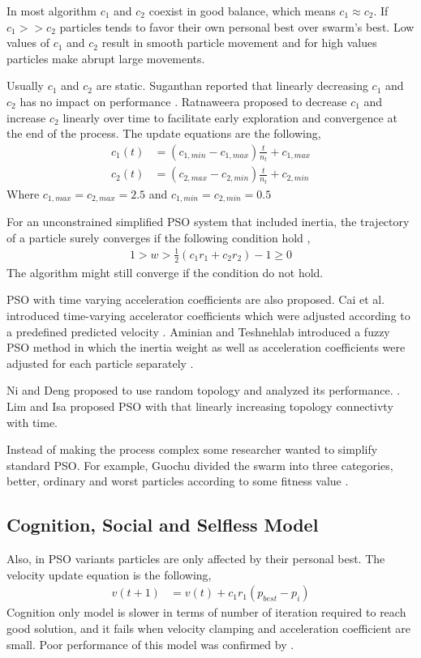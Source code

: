 \documentclass{article}
\begin{document}
In most algorithm $c_1$ and $c_2$ coexist in good balance, which means $c_1 \approx c_2$. If $c_1 >> c_2$ particles tends to favor their own personal best over swarm's best. Low values of $c_1$ and $c_2$ result in smooth particle movement and for high values particles make abrupt large movements.

Usually $c_1$ and $c_2$ are static. Suganthan reported that linearly decreasing $c_1$ and $c_2$ has no impact on performance \cite{suganthan1999particle}. Ratnaweera proposed to decrease $c_1$ and increase $c_2$ linearly over time to facilitate early exploration and convergence at the end of the process. The update equations are the following,
\begin{align*}
c_1(t) &=  (c_{1,min} - c_{1, max}) \frac{t}{n_t} + c_{1, max} \\
c_2(t) &=  (c_{2,max} - c_{2, min}) \frac{t}{n_t} + c_{2, min} 
\end{align*}
Where $c_{1, max} = c_{2, max} = 2.5$ and $c_{1, min} = c_{2,min} = 0.5$

For an unconstrained simplified PSO system that included inertia, the trajectory of a particle surely converges if the following condition hold \cite{trelea2003particle},
\begin{align*}
1 > w > \frac{1}{2}(c_1 r_1 + c_2 r_2) -1 \ge 0
\end{align*}
The algorithm might still converge if the condition do not hold.

PSO with time varying acceleration coefficients are also proposed. Cai et al. introduced  time-varying accelerator coefficients which were adjusted according to a predefined predicted velocity \cite{cai2009predicted}. Aminian and Teshnehlab introduced a fuzzy PSO method in which the inertia weight as well as acceleration coefficients were adjusted for each particle separately \cite{aminian2013novel}.


Ni and Deng proposed to use random topology and analyzed its performance. \cite{ni2013new}. Lim and Isa proposed PSO with that linearly increasing topology connectivty with time.

Instead of making the process complex some researcher wanted to simplify standard PSO. For example, Guochu divided the swarm into three categories, better, ordinary and worst particles according to some fitness value \cite{chen2010simplified}.

\subsection{Cognition, Social and Selfless Model}
Also, in PSO variants particles are only affected by their personal best. The velocity update equation is the following,
\begin{align*}
v(t+1) &= v(t) + c_1r_1(p_{best} - p_i)
\end{align*}
Cognition only model is slower in terms of number of iteration required to reach good solution, and it fails when velocity clamping and acceleration coefficient are small. Poor performance of this model was confirmed by  \cite{carlisle2000adapting}.
\end{document}
